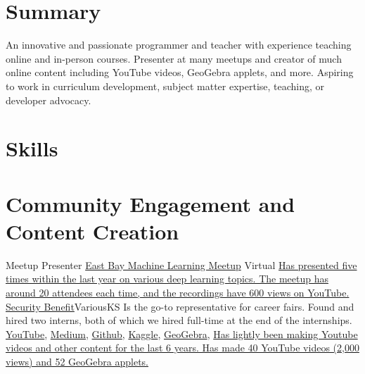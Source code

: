 \documentclass[11pt,a4paper,sans]{moderncv}
\begin{document}
\makecvtitle

\section{Summary}

An innovative and passionate programmer and teacher with
experience teaching online and in-person courses.
Presenter at many meetups and creator of much online content
including YouTube videos, GeoGebra applets, and more.
Aspiring to work in curriculum development, subject
matter expertise, teaching, or developer advocacy.


\section{Skills}


\section{Community Engagement and Content Creation}
    {Meetup Presenter}
    {\href{https://www.meetup.com/east-bay-tri-valley-machine-learning-meetup/}{East Bay Machine Learning Meetup}}
    {Virtual}{}
    {\href{https://www.youtube.com/playlist?list=PLytZkHFJwKUf-P1Q_AD-hvYKyH0VREKWw}
        {Has presented five times within the last year
        on various deep learning topics.
        The meetup has around 20 attendees each time, and
        the recordings have 600 views on YouTube.}}
    {\href{https://www.securitybenefit.com/splash-page}{Security Benefit}}{Various}{KS}
    {Is the go-to representative for career fairs.
    Found and hired two interns, both of which we hired full-time
    at the end of the internships.}
    {\href{https://www.youtube.com/@grantsmith3653/featured}{YouTube},
    \href{https://medium.com/@14.gsmith.14}{Medium},
    \href{https://github.com/GSmithApps}{Github},
    \href{https://www.kaggle.com/grannysmithapples}{Kaggle},
    \href{https://www.geogebra.org/u/gsmithapples}{GeoGebra},
    }
    {}{}{\href{https://www.youtube.com/@grantsmith3653/featured}{
        Has lightly been making Youtube videos and
        other content for the last 6 years.
        Has made 40 YouTube videos (2,000 views) and 52 GeoGebra applets.}}
\end{document}
